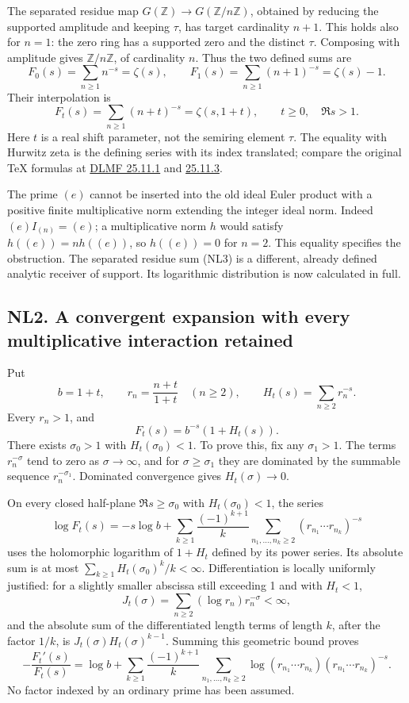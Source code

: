 \documentclass[
  10pt,
  a4paper,
]{article}
\begin{document}
The separated residue map \(G(\mathbb Z)\to G(\mathbb Z/n\mathbb Z)\),
obtained by reducing the supported amplitude and keeping \(\tau\), has
target cardinality \(n+1\). This holds also for \(n=1\): the zero ring
has a supported zero and the distinct \(\tau\). Composing with amplitude
gives \(\mathbb Z/n\mathbb Z\), of cardinality \(n\). Thus the two
defined sums are \[
F_0(s)=\sum_{n\ge1}n^{-s}=\zeta(s),\qquad
F_1(s)=\sum_{n\ge1}(n+1)^{-s}=\zeta(s)-1.
\tag{NL2}
\] Their interpolation is \[
F_t(s)=\sum_{n\ge1}(n+t)^{-s}=\zeta(s,1+t),\qquad t\ge0,\quad\Re s>1.
\tag{NL3}
\] Here \(t\) is a real shift parameter, not the semiring element
\(\tau\). The equality with Hurwitz zeta is the defining series with its
index translated; compare the original TeX formulas at
\href{https://dlmf.nist.gov/25.11.E1}{DLMF 25.11.1} and
\href{https://dlmf.nist.gov/25.11.E3}{25.11.3}.

The prime \((e)\) cannot be inserted into the old ideal Euler product
with a positive finite multiplicative norm extending the integer ideal
norm. Indeed \((e)I_{(n)}=(e)\); a multiplicative norm \(h\) would
satisfy \(h((e))=n h((e))\), so \(h((e))=0\) for \(n=2\). This equality
specifies the obstruction. The separated residue sum (NL3) is a
different, already defined analytic receiver of support. Its logarithmic
distribution is now calculated in full.

\subsection{NL2. A convergent expansion with every multiplicative
interaction
retained}\label{nl2.-a-convergent-expansion-with-every-multiplicative-interaction-retained}

Put \[
b=1+t,\qquad r_n=\frac{n+t}{1+t}\quad(n\ge2),\qquad
H_t(s)=\sum_{n\ge2}r_n^{-s}.
\tag{NL4}
\] Every \(r_n>1\), and \[
F_t(s)=b^{-s}(1+H_t(s)).
\tag{NL5}
\] There exists \(\sigma_0>1\) with \(H_t(\sigma_0)<1\). To prove this,
fix any \(\sigma_1>1\). The terms \(r_n^{-\sigma}\) tend to zero as
\(\sigma\to\infty\), and for \(\sigma\ge\sigma_1\) they are dominated by
the summable sequence \(r_n^{-\sigma_1}\). Dominated convergence gives
\(H_t(\sigma)\to0\).

On every closed half-plane \(\Re s\ge\sigma_0\) with
\(H_t(\sigma_0)<1\), the series \[
\log F_t(s)=-s\log b+
\sum_{k\ge1}\frac{(-1)^{k+1}}{k}
\sum_{n_1,\ldots,n_k\ge2}
(r_{n_1}\cdots r_{n_k})^{-s}
\tag{NL6}
\] uses the holomorphic logarithm of \(1+H_t\) defined by its power
series. Its absolute sum is at most
\(\sum_{k\ge1}H_t(\sigma_0)^k/k<\infty\). Differentiation is locally
uniformly justified: for a slightly smaller abscissa still exceeding 1
and with \(H_t<1\), \[
J_t(\sigma)=\sum_{n\ge2}(\log r_n)r_n^{-\sigma}<\infty,
\] and the absolute sum of the differentiated length terms of length
\(k\), after the factor \(1/k\), is \(J_t(\sigma)H_t(\sigma)^{k-1}\).
Summing this geometric bound proves \[
-\frac{F_t'(s)}{F_t(s)}
=\log b+
\sum_{k\ge1}\frac{(-1)^{k+1}}{k}
\sum_{n_1,\ldots,n_k\ge2}
\log(r_{n_1}\cdots r_{n_k})
(r_{n_1}\cdots r_{n_k})^{-s}.
\tag{NL7}
\] No factor indexed by an ordinary prime has been assumed.
\end{document}
